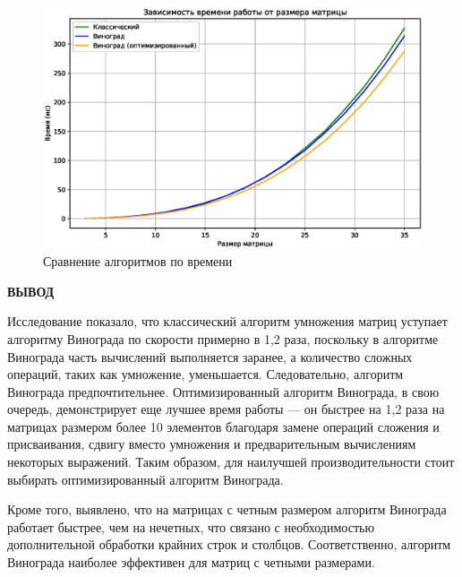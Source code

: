 \begin{figure}[H]
    \centering
    \includegraphics[width=1\linewidth]{img/graph.eps}
    \caption{Сравнение алгоритмов по времени}
    \label{fig:tm}
\end{figure}

\clearpage

\textbf{ВЫВОД}

Исследование показало, что классический алгоритм умножения матриц уступает алгоритму Винограда по скорости примерно в 1,2 раза, поскольку в алгоритме Винограда часть вычислений выполняется заранее, а количество сложных операций, таких как умножение, уменьшается. Следовательно, алгоритм Винограда предпочтительнее. Оптимизированный алгоритм Винограда, в свою очередь, демонстрирует еще лучшее время работы — он быстрее на 1,2 раза на матрицах размером более 10 элементов благодаря замене операций сложения и присваивания, сдвигу вместо умножения и предварительным вычислениям некоторых выражений. Таким образом, для наилучшей производительности стоит выбирать оптимизированный алгоритм Винограда.

Кроме того, выявлено, что на матрицах с четным размером алгоритм Винограда работает быстрее, чем на нечетных, что связано с необходимостью дополнительной обработки крайних строк и столбцов. Соответственно, алгоритм Винограда наиболее эффективен для матриц с четными размерами.